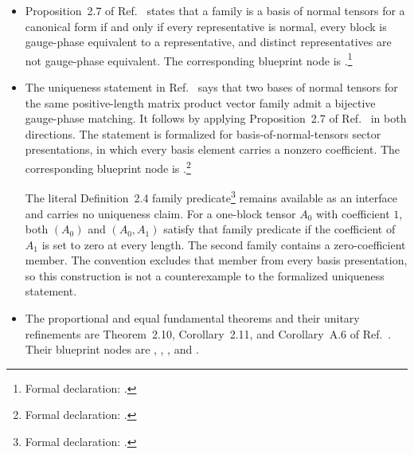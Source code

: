 \documentclass{article}
\begin{document}
\begin{itemize}
    \item Proposition~2.7 of
          Ref.~\cite[lines 278--280 and 1135--1146]
          {Cirac2016MPDO_arXiv} states that a family is a basis of normal
          tensors for a canonical form if and only if every representative is
          normal, every block is gauge-phase equivalent to a representative,
          and distinct representatives are not gauge-phase equivalent. The
          corresponding blueprint node is
          .\footnote{Formal declaration:
          .}

    \item The uniqueness statement in
          Ref.~\cite[line 1148]{Cirac2016MPDO_arXiv} says that two bases of
          normal tensors for the same positive-length matrix product vector
          family admit a bijective gauge-phase matching. It follows by
          applying Proposition~2.7 of
          Ref.~\cite{Cirac2016MPDO_arXiv} in both directions. The statement is
          formalized for basis-of-normal-tensors sector presentations, in
          which every basis element carries a nonzero coefficient. The
          corresponding blueprint node is
          .\footnote{Formal
          declaration:
          .}

          The literal Definition~2.4 family predicate\footnote{Formal
          declaration: .} remains
          available as an interface and carries no uniqueness claim. For a
          one-block tensor $A_0$ with coefficient $1$, both $(A_0)$ and
          $(A_0,A_1)$ satisfy that family predicate if the coefficient of
          $A_1$ is set to zero at every length. The second family contains a
          zero-coefficient member. The convention excludes that member from
          every basis presentation, so this construction is not a
          counterexample to the formalized uniqueness statement.

    \item The proportional and equal fundamental theorems and their unitary
          refinements are Theorem~2.10, Corollary~2.11, and Corollary~A.6 of
          Ref.~\cite[lines 349--361 and 1167--1199]
          {Cirac2016MPDO_arXiv}. Their blueprint nodes are
          ,
          ,
          , and
          .


\end{itemize}
\end{document}
